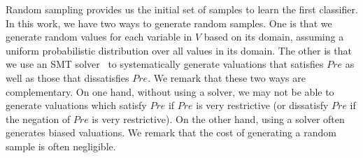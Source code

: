 %

Random sampling provides us the initial set of samples to learn the first classifier. In this work, we have two ways to generate random samples. One is that we generate random values for each variable in $V$ based on its domain, assuming a uniform probabilistic distribution over all values in its domain. The other is that we use an SMT solver~\cite{barrett2009satisfiability,de2008z3} to systematically generate valuations that satisfies $Pre$ as well as those that dissatisfies $Pre$. We remark that these two ways are complementary. On one hand, without using a solver, we may not be able to generate valuations which satisfy $Pre$ if $Pre$ is very restrictive (or dissatisfy $Pre$ if the negation of $Pre$ is very restrictive). On the other hand, using a solver often generates biased valuations. We remark that the cost of generating a random sample is often negligible.


